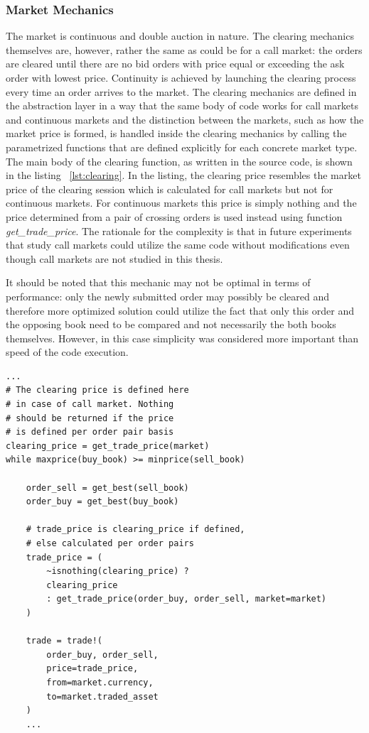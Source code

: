 \subsubsection{Market Mechanics}

The market is continuous and double auction in nature.
The clearing mechanics themselves are, however, 
rather the same as could be for a call market: 
the orders are cleared until there
are no bid orders with price equal or exceeding the
ask order with lowest price. 
Continuity is achieved by launching the clearing process
every time an order arrives to the market. 
The clearing mechanics are defined in 
the abstraction layer in a way that the same body
of code works for call markets and continuous markets
and the distinction between the markets, such as how 
the market price is formed, is handled inside the clearing
mechanics by calling the parametrized functions that are 
defined explicitly for each concrete market type. 
The main body of the clearing function, 
as written in the source code, is shown in the listing ~\ref{lst:clearing}.
In the listing, the clearing price resembles the market price
of the clearing session which is calculated for call markets but not for 
continuous markets. For continuous markets this price is simply nothing and
the price determined from a pair of crossing orders is used instead using function
\emph{get\_trade\_price}. The rationale for the complexity is that in future experiments
that study call markets could utilize the same code without modifications 
even though call markets are not studied in this thesis.

It should be noted that this mechanic may not be optimal in terms of performance: 
only the newly submitted order may possibly be cleared and therefore more 
optimized solution could utilize the fact that only this order and the opposing book 
need to be compared and not necessarily the both books themselves. However, 
in this case simplicity was considered more important than speed of the code execution.


\begin{lstlisting}[caption={Clearing process},label={lst:clearing}]
...
# The clearing price is defined here
# in case of call market. Nothing
# should be returned if the price
# is defined per order pair basis
clearing_price = get_trade_price(market)
while maxprice(buy_book) >= minprice(sell_book)

    order_sell = get_best(sell_book)
    order_buy = get_best(buy_book)
    
    # trade_price is clearing_price if defined,
    # else calculated per order pairs
    trade_price = (
        ~isnothing(clearing_price) ? 
        clearing_price
        : get_trade_price(order_buy, order_sell, market=market)
    )

    trade = trade!(
        order_buy, order_sell, 
        price=trade_price, 
        from=market.currency, 
        to=market.traded_asset
    )
    ...
\end{lstlisting}

